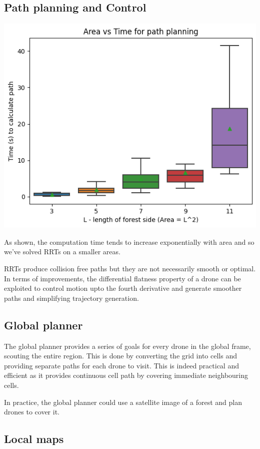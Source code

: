 \subsection{Path planning and Control}

\includegraphics[scale=0.5]{images/time_area.png}

As shown, the computation time tends to increase exponentially with area and so we've solved RRTs on a smaller areas.

RRTs produce collision free paths but they are not necessarily smooth or optimal.
In terms of improvements, the differential flatness property of a drone can be exploited to control motion upto the fourth derivative and generate smoother paths and simplifying trajectory generation.

 
\subsection{Global planner}

The global planner provides a series of goals for every drone in the global frame, scouting the entire region. This is done by converting the grid into cells and providing separate paths for each drone to visit. This is indeed practical and efficient as it provides continuous cell path by covering immediate neighbouring cells.

In practice, the global planner could use a satellite image of a forest and plan drones to cover it. 


\subsection{Local maps}

